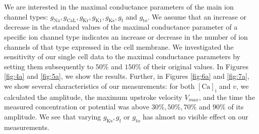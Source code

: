 \documentclass{article}
\begin{document}
We are interested in the maximal conductance parameters of the main ion channel types: $g_{\mathrm{Na}}, g_{\mathrm{CaL}}, g_{\mathrm{Kr}}, g_{\mathrm{K1}}, g_{\mathrm{Ks}}, g_{\mathrm{f}}$ and $g_{\mathrm{to}}$. We assume that an increase or decrease in the standard values of the maximal conductance parameter of a specific ion channel type indicates an increase or decrease in the number of ion channels of that type expressed in the cell membrane. We investigated the sensitivity of our single cell data to the maximal conductance parameters by setting them subsequently to $50\%$ and $150\%$ of their original values. In Figures \ref{fig:4a} and \ref{fig:5a}, we show the results. Further, in Figures \ref{fig:6a} and \ref{fig:7a}, we show several characteristics of our measurements: for both $[\mathrm{Ca}]_{\mathrm{i}}$ and $v$, we calculated the amplitude, the maximum upstroke velocity $V_{max}$, and the time the measured concentration or potential was above $30\%, 50\%, 70\%$ and $90\%$ of its amplitude. We see that varying $g_{\mathrm{Ks}}, g_{\mathrm{f}}$ or $g_{\mathrm{to}}$ has almost no visible effect on our measurements.
%
\end{document}
